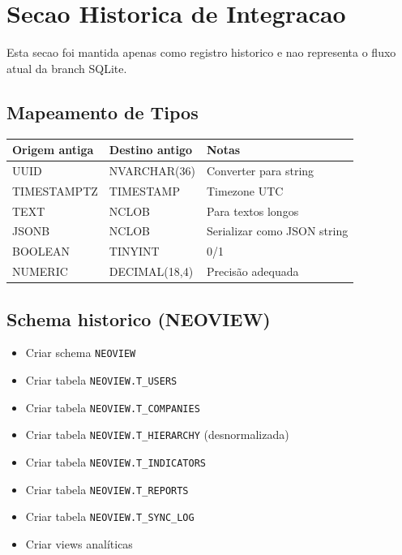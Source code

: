 \documentclass[12pt,a4paper]{article}
\newcommand{\checkbox}{$\square$}
\begin{document}
\section{Secao Historica de Integracao}

\begin{tcolorbox}[colback=orange!5!white,colframe=neoorange,title=\textbf{Conteudo historico}]
Esta secao foi mantida apenas como registro historico e nao representa o fluxo atual da branch SQLite.
\end{tcolorbox}

\subsection{Mapeamento de Tipos}

\begin{center}
\begin{tabular}{|l|l|l|}
\hline
\textbf{Origem antiga} & \textbf{Destino antigo} & \textbf{Notas} \\
\hline
UUID & NVARCHAR(36) & Converter para string \\
TIMESTAMPTZ & TIMESTAMP & Timezone UTC \\
TEXT & NCLOB & Para textos longos \\
JSONB & NCLOB & Serializar como JSON string \\
BOOLEAN & TINYINT & 0/1 \\
NUMERIC & DECIMAL(18,4) & Precisão adequada \\
\hline
\end{tabular}
\end{center}

\subsection{Schema historico (NEOVIEW)}

\begin{itemize}[label=\checkbox]
    \item Criar schema \texttt{NEOVIEW}
    \item Criar tabela \texttt{NEOVIEW.T\_USERS}
    \item Criar tabela \texttt{NEOVIEW.T\_COMPANIES}
    \item Criar tabela \texttt{NEOVIEW.T\_HIERARCHY} (desnormalizada)
    \item Criar tabela \texttt{NEOVIEW.T\_INDICATORS}
    \item Criar tabela \texttt{NEOVIEW.T\_REPORTS}
    \item Criar tabela \texttt{NEOVIEW.T\_SYNC\_LOG}
    \item Criar views analíticas
\end{itemize}
\end{document}
